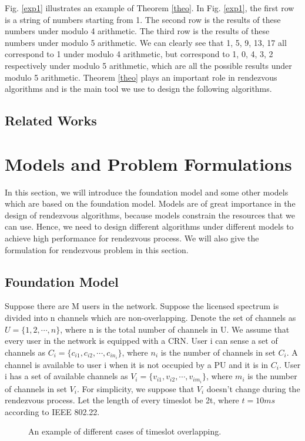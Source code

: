 \documentclass[10pt, conference, letterpaper]{IEEEtran}
\begin{document}
Fig. \ref{exp1} illustrates an example of Theorem \ref{theo}. In Fig. \ref{exp1}, the first row is a string of numbers starting from 1. The second row is the results of these numbers under modulo 4 arithmetic. The third row is the results of these numbers under modulo 5 arithmetic. We can clearly see that 1, 5, 9, 13, 17 all correspond to 1 under modulo 4 arithmetic, but correspond to 1, 0, 4, 3, 2 respectively under modulo 5 arithmetic, which are all the possible results under modulo 5 arithmetic. Theorem \ref{theo} plays an important role in rendezvous algorithms and is the main tool we use to design the following algorithms.
\subsection{Related Works}

\section{Models and Problem Formulations}
In this section, we will introduce the foundation model and some other models which are based on the foundation model. Models are of great importance in the design of rendezvous algorithms, because models constrain the resources that we can use. Hence, we need to design different algorithms under different models to achieve high performance for rendezvous process. We will also give the formulation for rendezvous problem in this section.


\subsection{Foundation Model}
Suppose there are M users in the network. Suppose the licensed spectrum is divided into n channels which are non-overlapping. Denote the set of channels as $U=\{1,2,\cdots,n\}$, where n is the total number of channels in U. We assume that every user in the network is equipped with a CRN. User i can sense a set of channels as
$C_i=\{c_{i1},c_{i2},\cdots,c_{in_i} \}$, where $n_i$ is the number of channels in set $C_i$. A channel is available to user i when it is not occupied by a PU and it is in $C_i$. User i has a set of available channels as $V_i = \{v_{i1},v_{i2},\cdots,v_{im_i}\}$, where $m_i$ is the number of channels in set $V_i$. For simplicity, we suppose that $V_i$ doesn't change during the rendezvous process. Let the length of every timeslot be 2t, where $t=10ms$ according to IEEE 802.22.

\begin{figure}
\centering
{}
\caption{An example of different cases of timeslot overlapping.}
\label{overlap}
\end{figure}
\end{document}
